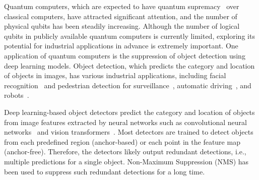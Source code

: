 Quantum computers, which are expected to have quantum supremacy~\cite{Arute2019} over classical computers, have attracted significant attention, and the number of physical qubits has been steadily increasing.
Although the number of logical qubits in publicly available quantum computers is currently limited, exploring its potential for industrial applications in advance is extremely important.
One application of quantum computers is the suppression of object detection using deep learning models.
Object detection, which predicts the category and location of objects in images, has various industrial applications, including facial recognition~\cite{YangLLT16} and pedestrian detection for surveillance~\cite{Dominguez-Sanchez18}, automatic driving~\cite{GeigerLU12}, and robots~\cite{MeiHPT15}.

Deep learning-based object detectors predict the category and location of objects from image features extracted by neural networks such as convolutional neural networks~\cite{SimonyanZ14aVGG,HeZRS16resnet} and vision transformers~\cite{DosovitskiyB0WZ21ViT,LiuL00W0LG21Swin}.
Most detectors are trained to detect objects from each predefined region (anchor-based) or each point in the feature map (anchor-free).
Therefore, the detectors likely output redundant detections, i.e., multiple predictions for a single object. Non-Maximum Suppression (NMS) has been used to suppress such redundant detections for a long time.

